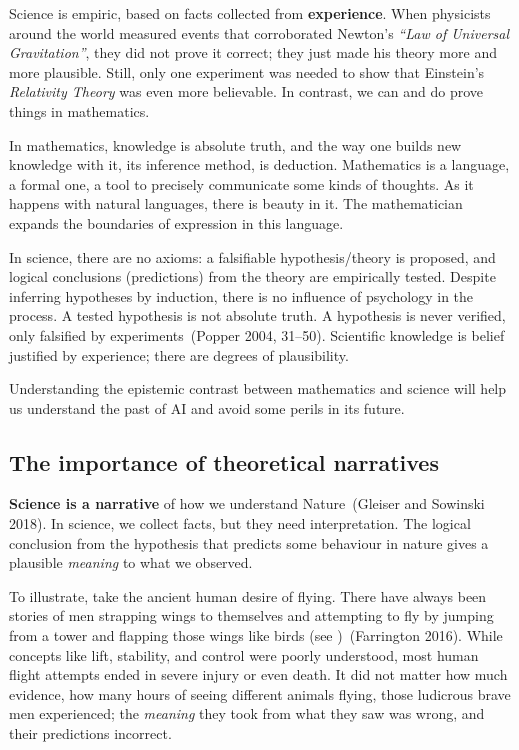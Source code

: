 \documentclass[
  letterpaper,
]{tufte-book}
\begin{document}
Science is empiric, based on facts collected from \textbf{experience}.
When physicists around the world measured events that corroborated
Newton's \emph{``Law of Universal Gravitation''}, they did not prove it
correct; they just made his theory more and more plausible. Still, only
one experiment was needed to show that Einstein's \emph{Relativity
Theory} was even more believable. In contrast, we can and do prove
things in mathematics.

In mathematics, knowledge is absolute truth, and the way one builds new
knowledge with it, its inference method, is deduction. Mathematics is a
language, a formal one, a tool to precisely communicate some kinds of
thoughts. As it happens with natural languages, there is beauty in it.
The mathematician expands the boundaries of expression in this language.

In science, there are no axioms: a falsifiable hypothesis/theory is
proposed, and logical conclusions (predictions) from the theory are
empirically tested. Despite inferring hypotheses by induction, there is
no influence of psychology in the process. A tested hypothesis is not
absolute truth. A hypothesis is never verified, only falsified by
experiments~(Popper 2004, 31--50). Scientific knowledge is belief
justified by experience; there are degrees of plausibility.

Understanding the epistemic contrast between mathematics and science
will help us understand the past of {AI} and avoid some perils in its
future.

\hypertarget{the-importance-of-theoretical-narratives}{%
\subsection{The importance of theoretical
narratives}\label{the-importance-of-theoretical-narratives}}

\textbf{Science is a narrative} of how we understand Nature~(Gleiser and
Sowinski 2018). In science, we collect facts, but they need
interpretation. The logical conclusion from the hypothesis that predicts
some behaviour in nature gives a plausible \emph{meaning} to what we
observed.

To illustrate, take the ancient human desire of flying. There have
always been stories of men strapping wings to themselves and attempting
to fly by jumping from a tower and flapping those wings like birds (see
)~(Farrington 2016). While concepts like lift, stability, and control
were poorly understood, most human flight attempts ended in severe
injury or even death. It did not matter how much evidence, how many
hours of seeing different animals flying, those ludicrous brave men
experienced; the \emph{meaning} they took from what they saw was wrong,
and their predictions incorrect.
\end{document}
